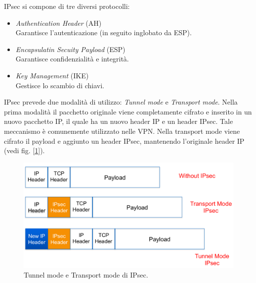 \documentclass[a4paper, 11pt, notitlepage, fleqn]{report}
\begin{document}
\noindent
IPsec si compone di tre diversi protocolli:
\begin{itemize}
	\item \emph{Authentication Header} (AH)\\
	Garantisce l'autenticazione (in seguito inglobato da ESP).
	\item \emph{Encapsulatin Secuity Payload} (ESP)\\
	Garantisce confidenzialità e integrità.
	\item \emph{Key Management} (IKE)\\
	Gestisce lo scambio di chiavi.
\end{itemize}
IPsec prevede due modalità di utilizzo: \emph{Tunnel mode} e \emph{Transport mode}. Nella prima modalità il pacchetto originale viene completamente cifrato e inserito in un nuovo pacchetto IP, il quale ha un nuovo header IP e un header IPsec. Tale meccanismo è comunemente utilizzato nelle VPN. Nella transport mode viene cifrato il payload e aggiunto un header IPsec, mantenendo l'originale header IP (vedi fig. [\ref{fig:tunneltransport}]).
\begin{figure}[htp]
	\centering
	\includegraphics[width=.9\textwidth]{images/TunnelTransport}
	\caption{Tunnel mode e Transport mode di IPsec.}\label{fig:tunneltransport}
\end{figure}
\end{document}
